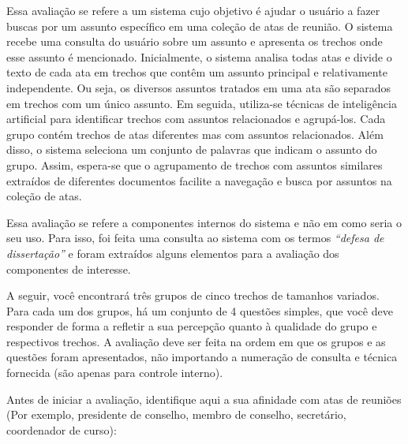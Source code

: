 
Essa avaliação se refere a um sistema cujo objetivo é ajudar o usuário a fazer buscas por um assunto específico em uma coleção de atas de reunião. O sistema recebe uma consulta do usuário sobre um assunto e apresenta os trechos onde esse assunto é mencionado. Inicialmente, o sistema analisa todas atas e divide o texto de cada ata em trechos que contêm um assunto principal e relativamente independente. Ou seja, os diversos assuntos tratados em uma ata são separados em trechos com um único assunto. Em seguida, utiliza-se técnicas de inteligência artificial para identificar trechos com assuntos relacionados e agrupá-los. Cada grupo contém trechos de atas diferentes mas com assuntos relacionados. Além disso, o sistema seleciona um conjunto de palavras que indicam o assunto do grupo. Assim, espera-se que o agrupamento de trechos com assuntos similares extraídos de diferentes documentos facilite a navegação e busca por assuntos na coleção de atas.

Essa avaliação se refere a componentes internos do sistema e não em como seria o seu uso. Para isso, foi feita uma consulta ao sistema com os termos \textit{``defesa de dissertação''} e foram extraídos 
%
%
alguns elementos 
para a avaliação dos componentes de interesse.

A seguir, você encontrará três grupos de cinco trechos de tamanhos variados. Para cada um dos grupos, há um conjunto de 4 questões simples, que você deve responder de forma a refletir a sua percepção quanto à qualidade do grupo e respectivos trechos. A avaliação deve ser feita na ordem em que os grupos e as questões foram apresentados, não importando a numeração de consulta e técnica fornecida (são apenas para controle interno).

Antes de iniciar a avaliação, identifique aqui a sua afinidade com atas de reuniões (Por exemplo, presidente de conselho, membro de conselho, secretário, coordenador de curso):








